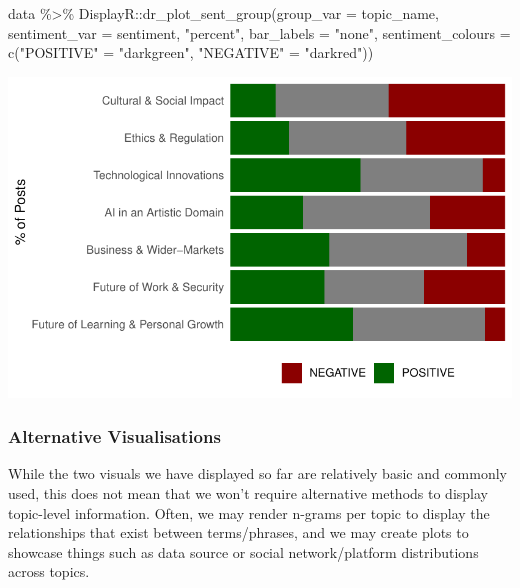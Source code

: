 \documentclass[
  letterpaper,
  DIV=11,
  numbers=noendperiod]{scrreprt}
\newenvironment{Shaded}{\begin{snugshade}}{\end{snugshade}}
\newcommand{\AttributeTok}[1]{\textcolor[rgb]{0.40,0.45,0.13}{#1}}
\newcommand{\FunctionTok}[1]{\textcolor[rgb]{0.28,0.35,0.67}{#1}}
\newcommand{\NormalTok}[1]{\textcolor[rgb]{0.00,0.23,0.31}{#1}}
\newcommand{\OtherTok}[1]{\textcolor[rgb]{0.00,0.23,0.31}{#1}}
\newcommand{\SpecialCharTok}[1]{\textcolor[rgb]{0.37,0.37,0.37}{#1}}
\newcommand{\StringTok}[1]{\textcolor[rgb]{0.13,0.47,0.30}{#1}}
\begin{document}
\begin{Shaded}
\begin{Highlighting}[]
\NormalTok{data }\SpecialCharTok{\%\textgreater{}\%} 
\NormalTok{  DisplayR}\SpecialCharTok{::}\FunctionTok{dr\_plot\_sent\_group}\NormalTok{(}\AttributeTok{group\_var =}\NormalTok{ topic\_name,}
                               \AttributeTok{sentiment\_var =}\NormalTok{ sentiment,}
                               \StringTok{"percent"}\NormalTok{, }\AttributeTok{bar\_labels =} \StringTok{"none"}\NormalTok{, }
                               \AttributeTok{sentiment\_colours =} \FunctionTok{c}\NormalTok{(}\StringTok{"POSITIVE"} \OtherTok{=} \StringTok{"darkgreen"}\NormalTok{,}
                                                     \StringTok{"NEGATIVE"} \OtherTok{=} \StringTok{"darkred"}\NormalTok{))}
\end{Highlighting}
\end{Shaded}

\includegraphics{quarto_docs/conversation_landscape_files/figure-pdf/unnamed-chunk-8-1.pdf}

\subsubsection{Alternative
Visualisations}\label{alternative-visualisations}

While the two visuals we have displayed so far are relatively basic and
commonly used, this does not mean that we won't require alternative
methods to display topic-level information. Often, we may render n-grams
per topic to display the relationships that exist between terms/phrases,
and we may create plots to showcase things such as data source or social
network/platform distributions across topics.
\end{document}
